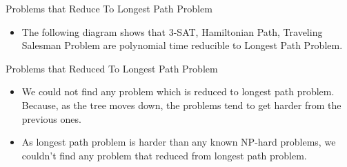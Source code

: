 \begin{frame}{Problems that Reduce To Longest Path Problem }
    
    \begin{itemize}
        \item The following diagram shows that 3-SAT, Hamiltonian Path, Traveling Salesman Problem are polynomial time reducible to Longest Path Problem.
    \end{itemize}
\end{frame}

\begin{frame}{Problems that Reduced To Longest Path Problem }
    
    \begin{itemize}
        \item We could not find any problem which is reduced to longest path problem. Because, as the tree moves down, the problems tend to get harder from the previous ones.
        \item As longest path problem is harder than any known NP-hard problems, we couldn't find any problem that reduced from longest path problem.
    \end{itemize}
\end{frame}